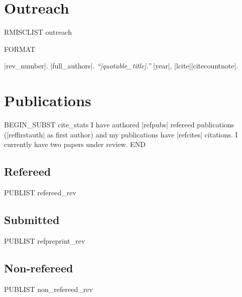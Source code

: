 \documentclass[letterpaper,11pt]{article}
\newlength{\mainindent} \setlength{\mainindent}{12pt}
\newlength{\contentindent} \setlength{\contentindent}{19ex}
\newenvironment{datelist}{
  \begingroup
  \raggedright
  \begin{description}[labelindent=\mainindent,leftmargin=\contentindent,
      style=sameline,font=\normalfont,topsep=0pt,partopsep=0pt,parsep=0pt,
      itemsep=4pt]
}{
  \end{description}
  \endgroup
}
\newenvironment{publist}{
  \begingroup
  \raggedright
  \begin{description}[leftmargin=4ex,style=sameline]
}{
  \end{description}
  \endgroup
}
\begin{document}



\section*{Outreach}
\begin{datelist}
RMISCLIST outreach
\end{datelist}


FORMAT \item[|rev_number|.] |full_authors|. \textit{``|quotable_title|.''} |year|, |lcite||citecountnote|.

\section*{Publications}

BEGIN_SUBST cite_stats
I have authored |refpubs| refereed publications (|reffirstauth| as first author) and
my publications have |refcites| citations.
I currently have two papers under review.
END


\subsection*{Refereed}

\begin{publist}
PUBLIST refereed_rev
\end{publist}

\subsection*{Submitted}

\begin{publist}
PUBLIST refpreprint_rev
\end{publist}

\subsection*{Non-refereed}

\begin{publist}
PUBLIST non_refereed_rev
\end{publist}
\end{document}
